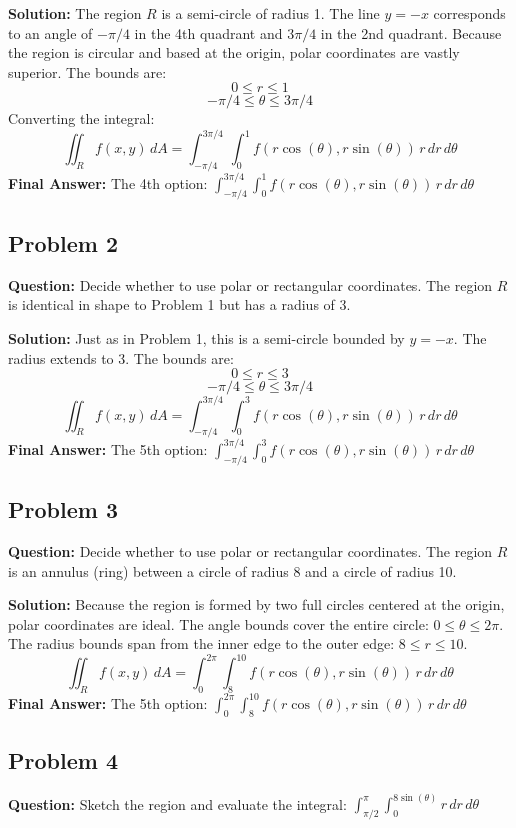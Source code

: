 \documentclass[12pt]{article}
\begin{document}
\textbf{Solution:}
The region $R$ is a semi-circle of radius 1. The line $y = -x$ corresponds to an angle of $-\pi/4$ in the 4th quadrant and $3\pi/4$ in the 2nd quadrant. Because the region is circular and based at the origin, polar coordinates are vastly superior. 
The bounds are:
\[ 0 \le r \le 1 \]
\[ -\pi/4 \le \theta \le 3\pi/4 \]
Converting the integral:
\[ \iint_R f(x,y) \, dA = \int_{-\pi/4}^{3\pi/4} \int_0^1 f(r\cos(\theta), r\sin(\theta)) \, r \, dr \, d\theta \]
\textbf{Final Answer:} The 4th option: $\int_{-\pi/4}^{3\pi/4} \int_0^1 f(r\cos(\theta), r\sin(\theta)) \, r \, dr \, d\theta$

\subsection*{Problem 2}
\textbf{Question:} Decide whether to use polar or rectangular coordinates. The region $R$ is identical in shape to Problem 1 but has a radius of 3.

\textbf{Solution:}
Just as in Problem 1, this is a semi-circle bounded by $y = -x$. The radius extends to 3.
The bounds are:
\[ 0 \le r \le 3 \]
\[ -\pi/4 \le \theta \le 3\pi/4 \]
\[ \iint_R f(x,y) \, dA = \int_{-\pi/4}^{3\pi/4} \int_0^3 f(r\cos(\theta), r\sin(\theta)) \, r \, dr \, d\theta \]
\textbf{Final Answer:} The 5th option: $\int_{-\pi/4}^{3\pi/4} \int_0^3 f(r\cos(\theta), r\sin(\theta)) \, r \, dr \, d\theta$

\subsection*{Problem 3}
\textbf{Question:} Decide whether to use polar or rectangular coordinates. The region $R$ is an annulus (ring) between a circle of radius 8 and a circle of radius 10.

\textbf{Solution:}
Because the region is formed by two full circles centered at the origin, polar coordinates are ideal.
The angle bounds cover the entire circle: $0 \le \theta \le 2\pi$.
The radius bounds span from the inner edge to the outer edge: $8 \le r \le 10$.
\[ \iint_R f(x,y) \, dA = \int_0^{2\pi} \int_8^{10} f(r\cos(\theta), r\sin(\theta)) \, r \, dr \, d\theta \]
\textbf{Final Answer:} The 5th option: $\int_0^{2\pi} \int_8^{10} f(r\cos(\theta), r\sin(\theta)) \, r \, dr \, d\theta$

\subsection*{Problem 4}
\textbf{Question:} Sketch the region and evaluate the integral: $\int_{\pi/2}^{\pi} \int_0^{8\sin(\theta)} r \, dr \, d\theta$
\end{document}
